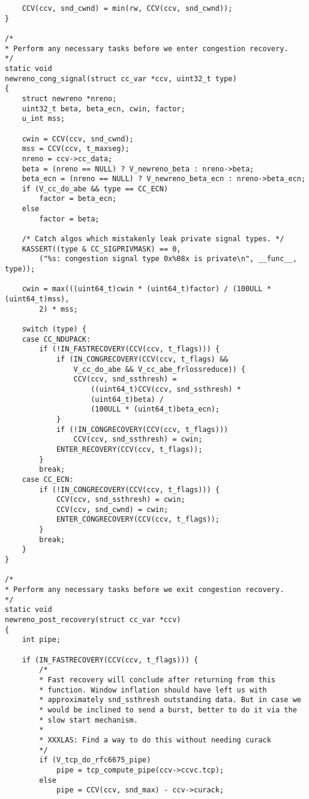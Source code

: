 \begin{code}
\begin{verbatim}
    CCV(ccv, snd_cwnd) = min(rw, CCV(ccv, snd_cwnd));
}

/*
* Perform any necessary tasks before we enter congestion recovery.
*/
static void
newreno_cong_signal(struct cc_var *ccv, uint32_t type)
{
    struct newreno *nreno;
    uint32_t beta, beta_ecn, cwin, factor;
    u_int mss;

    cwin = CCV(ccv, snd_cwnd);
    mss = CCV(ccv, t_maxseg);
    nreno = ccv->cc_data;
    beta = (nreno == NULL) ? V_newreno_beta : nreno->beta;
    beta_ecn = (nreno == NULL) ? V_newreno_beta_ecn : nreno->beta_ecn;
    if (V_cc_do_abe && type == CC_ECN)
        factor = beta_ecn;
    else
        factor = beta;

    /* Catch algos which mistakenly leak private signal types. */
    KASSERT((type & CC_SIGPRIVMASK) == 0,
        ("%s: congestion signal type 0x%08x is private\n", __func__, type));

    cwin = max(((uint64_t)cwin * (uint64_t)factor) / (100ULL * (uint64_t)mss),
        2) * mss;

    switch (type) {
    case CC_NDUPACK:
        if (!IN_FASTRECOVERY(CCV(ccv, t_flags))) {
            if (IN_CONGRECOVERY(CCV(ccv, t_flags) &&
                V_cc_do_abe && V_cc_abe_frlossreduce)) {
                CCV(ccv, snd_ssthresh) =
                    ((uint64_t)CCV(ccv, snd_ssthresh) *
                    (uint64_t)beta) /
                    (100ULL * (uint64_t)beta_ecn);
            }
            if (!IN_CONGRECOVERY(CCV(ccv, t_flags)))
                CCV(ccv, snd_ssthresh) = cwin;
            ENTER_RECOVERY(CCV(ccv, t_flags));
        }
        break;
    case CC_ECN:
        if (!IN_CONGRECOVERY(CCV(ccv, t_flags))) {
            CCV(ccv, snd_ssthresh) = cwin;
            CCV(ccv, snd_cwnd) = cwin;
            ENTER_CONGRECOVERY(CCV(ccv, t_flags));
        }
        break;
    }
}

/*
* Perform any necessary tasks before we exit congestion recovery.
*/
static void
newreno_post_recovery(struct cc_var *ccv)
{
    int pipe;

    if (IN_FASTRECOVERY(CCV(ccv, t_flags))) {
        /*
        * Fast recovery will conclude after returning from this
        * function. Window inflation should have left us with
        * approximately snd_ssthresh outstanding data. But in case we
        * would be inclined to send a burst, better to do it via the
        * slow start mechanism.
        *
        * XXXLAS: Find a way to do this without needing curack
        */
        if (V_tcp_do_rfc6675_pipe)
            pipe = tcp_compute_pipe(ccv->ccvc.tcp);
        else
            pipe = CCV(ccv, snd_max) - ccv->curack;


\end{verbatim}
\end{code}
